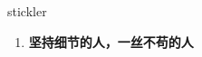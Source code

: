 
\begin{frame}
{\huge stickler}
\begin{center}
\begin{enumerate}\Large
  \item \textbf{坚持细节的人，一丝不苟的人}
\end{enumerate}
\end{center}
\end{frame}
